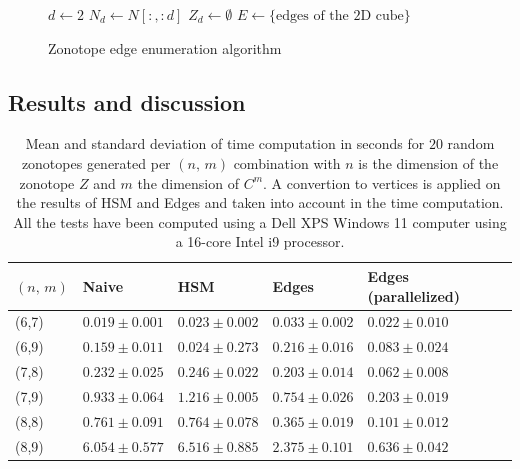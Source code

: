 \begin{figure}[ht]
    \centering
    \begin{minipage}{.6\linewidth}
        \begin{algorithm}[H]
            \SetAlgoLined
            $d\gets 2$\;
            $N_d\gets N[:,:d]$\;
            $Z_d\gets \emptyset$\;
            $E\gets \{\text{edges of the 2D cube}\}$ \;
            \caption{Zonotope edge enumeration algorithm}
        \end{algorithm}

    \end{minipage}
\end{figure}


\subsection{Results and discussion}

\begin{table}[]
    \centering
    \begin{tabular}{|l|l|l|l|l|}
    \hline
    $(n,\,m)$ & Naive & HSM  & Edges & Edges (parallelized) \\ \hline
    (6,7)       & $0.019\pm0.001$  & $0.023\pm 0.002$ & $0.033\pm 0.002$ & $\mathbf{0.022\pm 0.010}$   \\ \hline
    (6,9)       & $0.159\pm 0.011$ & $\mathbf{0.024\pm 0.273}$ & $0.216\pm 0.016$ & $0.083\pm 0.024$   \\ \hline
    (7,8)       & $0.232\pm 0.025$ & $0.246\pm 0.022$ & $0.203\pm 0.014$ & $\mathbf{0.062\pm 0.008}$   \\ \hline
    (7,9)       & $0.933\pm 0.064$ & $1.216\pm 0.005$ & $0.754\pm 0.026$ & $\mathbf{0.203\pm 0.019}$   \\ \hline
    (8,8)       & $0.761\pm 0.091$ & $0.764\pm 0.078$ & $0.365\pm 0.019$ & $\mathbf{0.101\pm 0.012}$   \\ \hline
    (8,9)       & $6.054\pm 0.577$ & $6.516\pm 0.885$ & $2.375\pm 0.101$ & $\mathbf{0.636\pm 0.042}$   \\ \hline
    \end{tabular}
    \caption{Mean and standard deviation of time computation in seconds for $20$ random zonotopes generated per $(n,\,m)$ combination
    with $n$ is the dimension of the zonotope $Z$ and $m$ the dimension of $C^m$. A convertion to vertices is applied on the results of HSM and Edges and 
    taken into account in the time computation. All the tests have been computed using a Dell XPS Windows 11 computer using a 16-core Intel i9 processor.}
\end{table}


